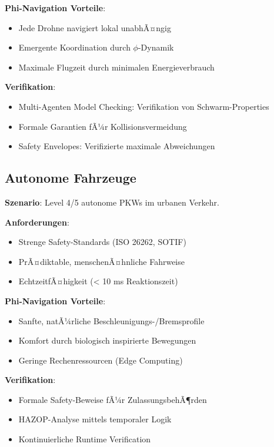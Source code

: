 ﻿\documentclass[a4paper,12pt]{article}
\theoremstyle{definition}
\begin{document}
\textbf{Phi-Navigation Vorteile}:
\begin{itemize}
	\item Jede Drohne navigiert lokal unabhÃ¤ngig
	\item Emergente Koordination durch $\phi$-Dynamik
	\item Maximale Flugzeit durch minimalen Energieverbrauch
\end{itemize}

\textbf{Verifikation}:
\begin{itemize}
	\item Multi-Agenten Model Checking: Verifikation von Schwarm-Properties
	\item Formale Garantien fÃ¼r Kollisionsvermeidung
	\item Safety Envelopes: Verifizierte maximale Abweichungen
\end{itemize}

\subsection{Autonome Fahrzeuge}

\textbf{Szenario}: Level 4/5 autonome PKWs im urbanen Verkehr.

\textbf{Anforderungen}:
\begin{itemize}
	\item Strenge Safety-Standards (ISO 26262, SOTIF)
	\item PrÃ¤diktable, menschenÃ¤hnliche Fahrweise
	\item EchtzeitfÃ¤higkeit (< 10 ms Reaktionszeit)
\end{itemize}

\textbf{Phi-Navigation Vorteile}:
\begin{itemize}
	\item Sanfte, natÃ¼rliche Beschleunigungs-/Bremsprofile
	\item Komfort durch biologisch inspirierte Bewegungen
	\item Geringe Rechenressourcen (Edge Computing)
\end{itemize}

\textbf{Verifikation}:
\begin{itemize}
	\item Formale Safety-Beweise fÃ¼r ZulassungsbehÃ¶rden
	\item HAZOP-Analyse mittels temporaler Logik
	\item Kontinuierliche Runtime Verification
\end{itemize}
\end{document}
